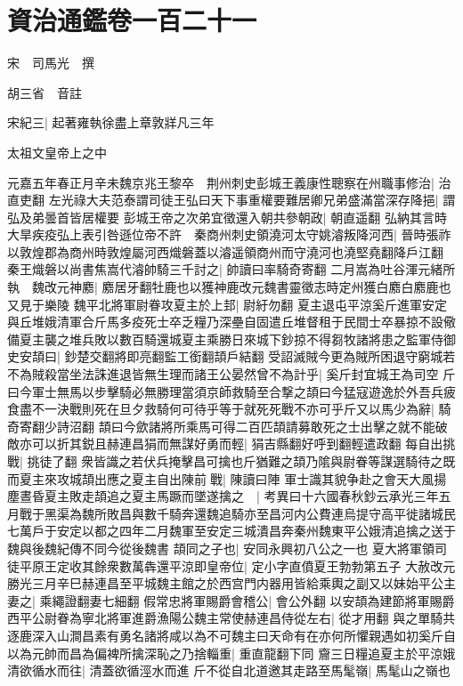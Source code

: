 \section{資治通鑑卷一百二十一}
宋　司馬光　撰

胡三省　音註

宋紀三|{
	起著雍執徐盡上章敦牂凡三年}


太祖文皇帝上之中

元嘉五年春正月辛未魏京兆王黎卒　荆州刺史彭城王義康性聰察在州職事修治|{
	治直吏翻}
左光祿大夫范泰謂司徒王弘曰天下事重權要難居卿兄弟盛滿當深存降挹|{
	謂弘及弟曇首皆居權要}
彭城王帝之次弟宜徵還入朝共參朝政|{
	朝直遥翻}
弘納其言時大旱疾疫弘上表引咎遜位帝不許　秦商州刺史領澆河太守姚濬叛降河西|{
	晉時張祚以敦煌郡為商州時敦煌屬河西熾磐蓋以濬遥領商州而守澆河也澆堅堯翻降戶江翻}
秦王熾磐以尚書焦嵩代濬帥騎三千討之|{
	帥讀曰率騎奇寄翻}
二月嵩為吐谷渾元緒所執　魏改元神䴥|{
	䴥居牙翻牡鹿也以獲神鹿改元魏書靈徵志時定州獲白䴥白䴥鹿也又見于樂陵}
魏平北將軍尉眷攻夏主於上邽|{
	尉紆勿翻}
夏主退屯平涼奚斤進軍安定與丘堆娥清軍合斤馬多疫死士卒乏糧乃深壘自固遣丘堆督租于民間士卒暴掠不設儆備夏主襲之堆兵敗以數百騎還城夏主乘勝日來城下鈔掠不得芻牧諸將患之監軍侍御史安頡曰|{
	鈔楚交翻將即亮翻監工銜翻頡戶結翻}
受詔滅賊今更為賊所困退守窮城若不為賊殺當坐法誅進退皆無生理而諸王公晏然曾不為計乎|{
	奚斤封宜城王為司空}
斤曰今軍士無馬以步擊騎必無勝理當須京師救騎至合撃之頡曰今猛寇遊逸於外吾兵疲食盡不一決戰則死在旦夕救騎何可待乎等于就死死戰不亦可乎斤又以馬少為辭|{
	騎奇寄翻少詩沼翻}
頡曰今歛諸將所乘馬可得二百匹頡請募敢死之士出擊之就不能破敵亦可以折其鋭且赫連昌狷而無謀好勇而輕|{
	狷吉縣翻好呼到翻輕遣政翻}
每自出挑戰|{
	挑徒了翻}
衆皆識之若伏兵掩擊昌可擒也斤猶難之頡乃隂與尉眷等謀選騎待之既而夏主來攻城頡出應之夏主自出陳前戰|{
	陳讀曰陣}
軍士識其貌争赴之會天大風揚塵晝昏夏主敗走頡追之夏主馬蹶而墜遂擒之　|{
	考異曰十六國春秋鈔云承光三年五月戰于黑渠為魏所敗昌與數千騎奔還魏追騎亦至昌河内公費連烏提守高平徙諸城民七萬戶于安定以都之四年二月魏軍至安定三城潰昌奔秦州魏東平公娥清追擒之送于魏與後魏紀傳不同今從後魏書}
頡同之子也|{
	安同永興初八公之一也}
夏大將軍領司徒平原王定收其餘衆數萬犇還平涼即皇帝位|{
	定小字直僨夏王勃勃第五子}
大赦改元勝光三月辛巳赫連昌至平城魏主館之於西宫門内器用皆給乘輿之副又以妹始平公主妻之|{
	乘繩證翻妻七細翻}
假常忠將軍賜爵會稽公|{
	會公外翻}
以安頡為建節將軍賜爵西平公尉眷為寧北將軍進爵漁陽公魏主常使赫連昌侍從左右|{
	從才用翻}
與之單騎共逐鹿深入山澗昌素有勇名諸將咸以為不可魏主曰天命有在亦何所懼親遇如初奚斤自以為元帥而昌為偏裨所擒深恥之乃捨輜重|{
	重直龍翻下同}
齎三日糧追夏主於平涼娥清欲循水而往|{
	清蓋欲循涇水而進}
斤不從自北道邀其走路至馬髦嶺|{
	馬髦山之嶺也}
